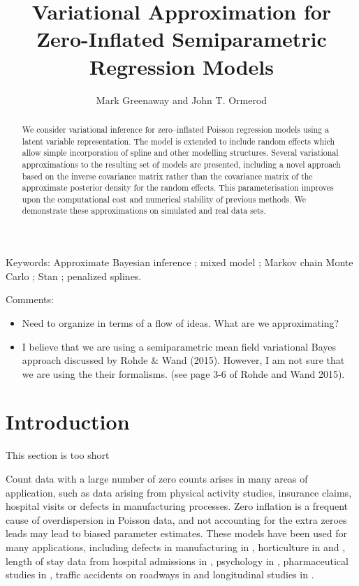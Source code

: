 \documentclass{amsart}[12pt]
\newcommand{\mgc}[1]{{\color{blue}#1}}
\newcommand{\joc}[1]{{\color{red}#1}}
\begin{document}
\title{Variational Approximation for Zero-Inflated Semiparametric Regression Models}
\author{Mark Greenaway and John T. Ormerod}

\begin{abstract}
	\noindent We consider variational inference for zero--inflated Poisson regression models using a latent
	variable representation. The model is extended to include random effects which allow simple incorporation of
	spline and other modelling structures. Several variational approximations to the resulting set of models are
	presented, including a novel approach based on the inverse covariance matrix rather than the covariance matrix
	of the approximate posterior density for the random effects. This parameterisation improves upon the
	computational cost and numerical stability of previous methods. We demonstrate these approximations on
	simulated and real data sets.
\end{abstract}
 
\maketitle

\noindent Keywords: Approximate Bayesian inference ; mixed model ; Markov chain Monte Carlo ; Stan ; penalized splines.

\joc{
	Comments: 
	\begin{itemize}
		\item Need to organize in terms of a flow of ideas. What are we approximating?
		      		      		      
		\item I believe that we are using a semiparametric mean field variational Bayes approach discussed by Rohde \& Wand (2015).
		      However, I am not sure that we are using the their formalisms. (see page 3-6 of Rohde and Wand 2015).
	\end{itemize}	
}

\section{Introduction}
\label{sec:introduction}

\mgc{This section is too short}

Count data with a large number of zero counts arises in many areas of application, such as data arising from
physical activity studies, insurance claims, hospital visits or defects in manufacturing processes. Zero
inflation is a frequent cause of overdispersion in Poisson data, and not accounting for the extra zeroes leads
may lead to biased parameter estimates. These models have been used for many applications, including defects
in manufacturing in \citep{lambert1992}, horticulture in \citep{BIOM:BIOM1030} and \citep{Hall2000}, length of
stay data from hospital admissions in \citep{BIMJ:BIMJ200390024}, psychology in \citep{JOFP:rethink},
pharmaceutical studies in \citep{Min01042005}, traffic accidents on roadways in \citep{Shankar1997829} and
longitudinal studies in \citep{LeeWangScottYauMcLachlan2006}.
\end{document}
